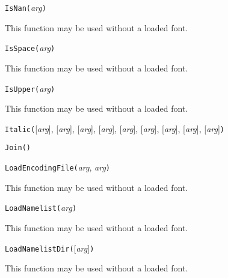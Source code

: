 

\texttt{IsNan(}\textit{arg}\texttt{)}

This function may be used without a loaded font.



\texttt{IsSpace(}\textit{arg}\texttt{)}

This function may be used without a loaded font.



\texttt{IsUpper(}\textit{arg}\texttt{)}

This function may be used without a loaded font.



\texttt{Italic(}[\textit{arg}], [\textit{arg}], [\textit{arg}], [\textit{arg}], [\textit{arg}], [\textit{arg}], [\textit{arg}], [\textit{arg}], [\textit{arg}]\texttt{)}



\texttt{Join(}\texttt{)}



\texttt{LoadEncodingFile(}\textit{arg}, \textit{arg}\texttt{)}

This function may be used without a loaded font.



\texttt{LoadNamelist(}\textit{arg}\texttt{)}

This function may be used without a loaded font.



\texttt{LoadNamelistDir(}[\textit{arg}]\texttt{)}

This function may be used without a loaded font.



